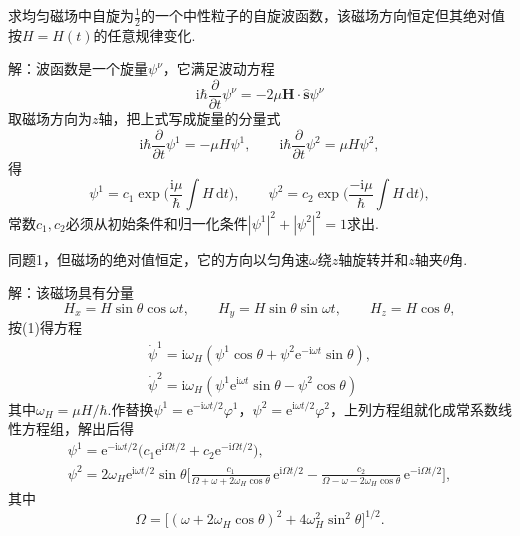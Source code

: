 \begin{xiti}

\quad 求均匀磁场中自旋为$\frac{1}{2}$的一个中性粒子的自旋波函数，该磁场方向恒定但其绝对值按$H=H(t)$的任意规律变化.

解：波函数是一个旋量$\psi^{\nu}$，它满足波动方程
\setcounter{equation}{0}\renewcommand{\theequation}{\arabic{equation}}%
\begin{equation}
  \mathrm{i}\hbar\frac{\partial}{\partial t}\psi^{\nu}
  =-2\mu\boldsymbol{H}\cdot\hat{\boldsymbol{s}}\psi^{\nu}
\end{equation}
取磁场方向为$z$轴，把上式写成旋量的分量式
\begin{equation*}
  \mathrm{i}\hbar\frac{\partial}{\partial t}\psi^1=-\mu H\psi^1,\qquad
  \mathrm{i}\hbar\frac{\partial}{\partial t}\psi^2=\mu H\psi^2,
\end{equation*}
得
\begin{equation*}
  \psi^1=c_1\exp\biggl(\frac{\mathrm{i}\mu}{\hbar}\int H\,\mathrm{d}t\biggr),\qquad
  \psi^2=c_2\exp\biggl(\frac{-\mathrm{i}\mu}{\hbar}\int H\,\mathrm{d}t\biggr),
\end{equation*}
常数$c_1,c_2$必须从初始条件和归一化条件$|\psi^1|^2+|\psi^2|^2=1$求出.

\quad 同题1，但磁场的绝对值恒定，它的方向以匀角速$\omega$绕$z$轴旋转并和$z$轴夹$\theta$角.

解：该磁场具有分量
\begin{equation*}
  H_x=H\sin\theta\cos\omega t,\qquad
  H_y=H\sin\theta\sin\omega t,\qquad
  H_z=H\cos\theta,
\end{equation*}
按(1)得方程
\begin{gather*}
  \dot{\psi}^1=\mathrm{i}\omega_H(\psi^1\cos\theta+\psi^2\mathrm{e}^{-\mathrm{i}\omega t}\sin\theta),\\
  \dot{\psi}^2=\mathrm{i}\omega_H(\psi^1\mathrm{e}^{\mathrm{i}\omega t}\sin\theta-\psi^2\cos\theta)
\end{gather*}
其中$\omega_H=\mu H/\hbar$.作替换$\psi^1=\mathrm{e}^{-\mathrm{i}\omega t/2}\varphi^1$，$\psi^2=\mathrm{e}^{\mathrm{i}\omega t/2}\varphi^2$，上列方程组就化成常系数线性方程组，解出后得
\begin{gather*}
  \psi^1=\mathrm{e}^{-\mathrm{i}\omega t/2}
  \bigl(c_1\mathrm{e}^{\mathrm{i}\Omega t/2}+c_2\mathrm{e}^{-\mathrm{i}\Omega t/2}\bigr),\\
  \psi^2=2\omega_H\mathrm{e}^{\mathrm{i}\omega t/2}\sin\theta
  \biggl[\frac{c_1}{\Omega+\omega+2\omega_H\cos\theta}\,\mathrm{e}^{\mathrm{i}\Omega t/2}
  -\frac{c_2}{\Omega-\omega-2\omega_H\cos\theta}\,\mathrm{e}^{-\mathrm{i}\Omega t/2}\biggr],
\end{gather*}
其中
\begin{equation*}
  \Omega=\bigl[(\omega+2\omega_H\cos\theta)^2+4\omega_H^2\sin^2\theta\bigr]^{1/2}.
\end{equation*}

\end{xiti}
\renewcommand{\theequation}{\arabic{section}.\arabic{equation}}%


